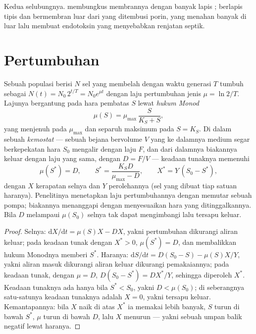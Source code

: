 \begin{omfigure}
{\small Kedua selubungnya.  membungkus membrannya dengan banyak
lapis ;  berlapis tipis dan bermembran luar dari
 yang ditembusi porin, yang menahan banyak
 di luar lalu membuat endotoksin yang menyebabkan renjatan septik.}
\end{omfigure}

\section{Pertumbuhan}

\begin{theorem}\label{thm:b3:bacteriology:monod}
%
Sebuah populasi berisi $N$ sel yang membelah dengan waktu generasi $T$ tumbuh
sebagai $N(t) = N_{0}\,2^{t/T} = N_{0}e^{\mu t}$ dengan laju pertumbuhan jenis $\mu =
\ln 2/T$. Lajunya bergantung pada hara pembatas $S$ lewat
\emph{hukum Monod}
\[
\mu(S) = \mu_{\max}\,\frac{S}{K_{S} + S},
\]
yang menjenuh pada $\mu_{\max}$ dan separuh maksimum pada $S = K_{S}$. Di
dalam sebuah \emph{kemostat} --- sebuah bejana bervolume $V$ yang ke dalamnya
medium segar berkepekatan hara $S_{0}$ mengalir dengan laju $F$, dan dari
dalamnya biakannya keluar dengan laju yang sama, dengan 
$D = F/V$ --- keadaan tunaknya memenuhi
\[
\mu(S^{*}) = D,\qquad S^{*} = \frac{K_{S}D}{\mu_{\max} - D},\qquad
X^{*} = Y\,(S_{0} - S^{*}),
\]
dengan $X$ kerapatan selnya dan $Y$ perolehannya (sel yang dibuat tiap satuan
haranya). Penelitinya menetapkan laju pertumbuhannya dengan memutar sebuah
pompa; biakannya menanggapi dengan menyesuaikan hara yang ditinggalkannya. Bila
$D$ melampaui $\mu(S_{0})$ selnya tak dapat mengimbangi lalu tersapu keluar.
\end{theorem}
\begin{proof}
Selnya: $\mathrm{d}X/\mathrm{d}t = \mu(S)X - DX$, yakni pertumbuhan dikurangi
aliran keluar; pada keadaan tunak dengan $X^{*} > 0$, $\mu(S^{*}) = D$, dan
membalikkan hukum Monodnya memberi $S^{*}$. Haranya: $\mathrm{d}S/\mathrm{d}t = D(S_{0} -
S) - \mu(S)X/Y$, yakni aliran masuk dikurangi aliran keluar dikurangi
pemakaiannya; pada keadaan tunak, dengan $\mu = D$, $D(S_{0} - S^{*}) = DX^{*}/Y$,
sehingga diperoleh $X^{*}$. Keadaan tunaknya ada hanya bila $S^{*} < S_{0}$,
yakni $D <
\mu(S_{0})$; di seberangnya satu-satunya keadaan tunaknya adalah $X = 0$, yakni
tersapu keluar. Kemantapannya: bila $X$ naik di atas $X^{*}$ ia memakai lebih
banyak, $S$ turun di bawah $S^{*}$, $\mu$ turun di bawah $D$, lalu $X$ menurun
--- yakni sebuah umpan balik negatif lewat haranya.
\end{proof}

